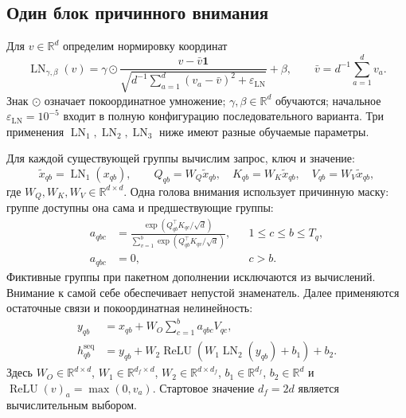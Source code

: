 \documentclass[12pt,a4paper]{article}
\newcommand{\R}{\mathbb R}
\newcommand{\eps}{\varepsilon}
\theoremstyle{plainru}
\begin{document}
\subsection{Один блок причинного внимания}
\label{sec:sequence-attention}

Для $v\in\R^d$ определим нормировку координат
\begin{equation}\label{eq:sequence-layernorm}
\operatorname{LN}_{\gamma,\beta}(v)
=\gamma\odot
\frac{v-\bar v\boldsymbol 1}
{\sqrt{d^{-1}\sum_{a=1}^d(v_a-\bar v)^2+\eps_{\mathrm{LN}}}}
+\beta,\qquad
\bar v=d^{-1}\sum_{a=1}^dv_a.
\end{equation}
Знак $\odot$ означает покоординатное умножение;
$\gamma,\beta\in\R^d$ обучаются; начальное $\eps_{\mathrm{LN}}=10^{-5}$
входит в полную конфигурацию последовательного варианта.
Три применения $\operatorname{LN}_1,\operatorname{LN}_2,
\operatorname{LN}_3$ ниже имеют разные обучаемые параметры.

Для каждой существующей группы вычислим запрос, ключ и значение:
\begin{equation}\label{eq:sequence-qkv}
\tilde x_{qb}=\operatorname{LN}_1(x_{qb}),\qquad
Q_{qb}=W_Q\tilde x_{qb},\quad
K_{qb}=W_K\tilde x_{qb},\quad
V_{qb}=W_V\tilde x_{qb},
\end{equation}
где $W_Q,W_K,W_V\in\R^{d\times d}$.
Одна голова внимания использует причинную маску: группе доступны
она сама и предшествующие группы:
\begin{align}\label{eq:sequence-attention}
a_{qbc}
&=\frac{\exp(Q_{qb}^{\top}K_{qc}/\sqrt d)}
{\sum_{v=1}^{b}\exp(Q_{qb}^{\top}K_{qv}/\sqrt d)},
&&1\le c\le b\le T_q,\\
a_{qbc}&=0,&&c>b.\nonumber
\end{align}
Фиктивные группы при пакетном дополнении исключаются из вычислений.
Внимание к самой себе обеспечивает непустой знаменатель.
Далее применяются остаточные связи и покоординатная нелинейность:
\begin{align}\label{eq:sequence-ffn}
y_{qb}&=x_{qb}+W_O\sum_{c=1}^{b}a_{qbc}V_{qc},\\
h_{qb}^{\mathrm{seq}}
&=y_{qb}
+W_2\operatorname{ReLU}\!\left(
W_1\operatorname{LN}_2(y_{qb})+b_1\right)+b_2.\nonumber
\end{align}
Здесь $W_O\in\R^{d\times d}$,
$W_1\in\R^{d_f\times d}$, $W_2\in\R^{d\times d_f}$,
$b_1\in\R^{d_f}$, $b_2\in\R^d$ и
$\operatorname{ReLU}(v)_a=\max(0,v_a)$.
Стартовое значение $d_f=2d$ является вычислительным выбором.
\end{document}
